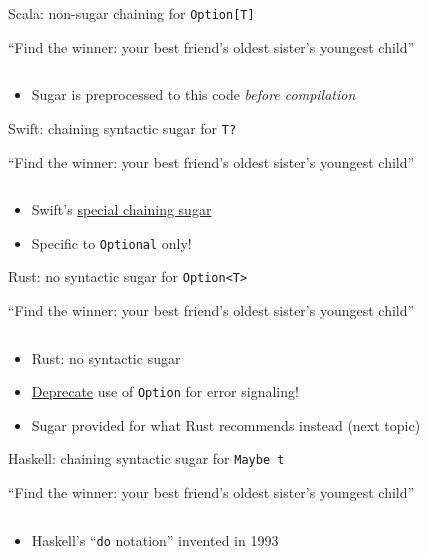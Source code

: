 \begin{frame}{Scala: non-sugar chaining for \texttt{Option[T]}}
  \begin{example}{``Find the winner: your best friend's oldest sister's
      youngest child''}
    \inputminted{scala}{NoSugarOptionWinner.scala}
  \end{example}

  \begin{itemize}
  \item Sugar is preprocessed to this code \emph{before compilation}
  \end{itemize}
\end{frame}

\begin{frame}{Swift: chaining syntactic sugar for \texttt{T?}}
  \begin{example}{``Find the winner: your best friend's oldest sister's
      youngest child''}
    \inputminted{swift}{OptionWinner.swift}
  \end{example}

  \begin{itemize}
  \item Swift's \href{https://developer.apple.com/library/ios/documentation/Swift/Conceptual/Swift_Programming_Language/OptionalChaining.html}{special
    chaining sugar}
  \item Specific to \texttt{Optional} only!
  \end{itemize}
\end{frame}

\begin{frame}{Rust: no syntactic sugar for \texttt{Option<T>}}
  \begin{example}{``Find the winner: your best friend's oldest sister's
      youngest child''}
    \inputminted{rust}{option_winner.rs}
  \end{example}

  \begin{itemize}
  \item Rust: no syntactic sugar
  \item
    \href{http://aturon.github.io/errors/signaling.html}{Deprecate}
    use of \texttt{Option} for error signaling!
  \item Sugar provided for what Rust recommends instead (next topic)
  \end{itemize}
\end{frame}

\begin{frame}{Haskell: chaining syntactic sugar for \texttt{Maybe t}}
  \begin{example}{``Find the winner: your best friend's oldest sister's
      youngest child''}
    \inputminted{haskell}{OptionWinner.hs}
  \end{example}

  \begin{itemize}
  \item Haskell's ``\texttt{do} notation'' invented in 1993
  \end{itemize}
\end{frame}


